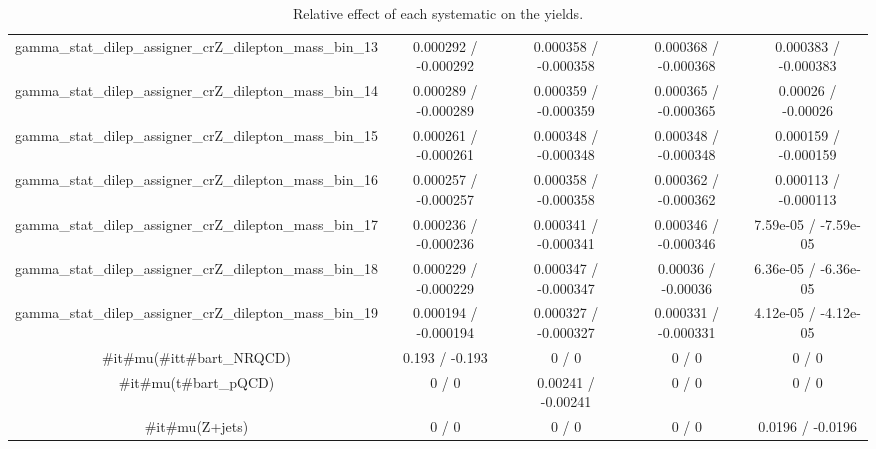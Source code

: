 \documentclass[10pt]{article}
\begin{document}
\begin{table}[htbp]
\begin{center}
\begin{tabular}{|c|c|c|c|c|}
  gamma_stat_dilep_assigner_crZ_dilepton_mass_bin_13 & 0.000292 / -0.000292 & 0.000358 / -0.000358 & 0.000368 / -0.000368 & 0.000383 / -0.000383 \\ 
  gamma_stat_dilep_assigner_crZ_dilepton_mass_bin_14 & 0.000289 / -0.000289 & 0.000359 / -0.000359 & 0.000365 / -0.000365 & 0.00026 / -0.00026 \\ 
  gamma_stat_dilep_assigner_crZ_dilepton_mass_bin_15 & 0.000261 / -0.000261 & 0.000348 / -0.000348 & 0.000348 / -0.000348 & 0.000159 / -0.000159 \\ 
  gamma_stat_dilep_assigner_crZ_dilepton_mass_bin_16 & 0.000257 / -0.000257 & 0.000358 / -0.000358 & 0.000362 / -0.000362 & 0.000113 / -0.000113 \\ 
  gamma_stat_dilep_assigner_crZ_dilepton_mass_bin_17 & 0.000236 / -0.000236 & 0.000341 / -0.000341 & 0.000346 / -0.000346 & 7.59e-05 / -7.59e-05 \\ 
  gamma_stat_dilep_assigner_crZ_dilepton_mass_bin_18 & 0.000229 / -0.000229 & 0.000347 / -0.000347 & 0.00036 / -0.00036 & 6.36e-05 / -6.36e-05 \\ 
  gamma_stat_dilep_assigner_crZ_dilepton_mass_bin_19 & 0.000194 / -0.000194 & 0.000327 / -0.000327 & 0.000331 / -0.000331 & 4.12e-05 / -4.12e-05 \\ 
  #it{#mu}(#it{t#bar{t}}_{NRQCD}) & 0.193 / -0.193 & 0 / 0 & 0 / 0 & 0 / 0 \\ 
  #it{#mu}(t#bar{t}_{pQCD}) & 0 / 0 & 0.00241 / -0.00241 & 0 / 0 & 0 / 0 \\ 
  #it{#mu}(Z+jets) & 0 / 0 & 0 / 0 & 0 / 0 & 0.0196 / -0.0196 \\ 
\hline 
\end{tabular} 
\caption{Relative effect of each systematic on the yields.} 
\end{center} 
\end{table} 
\end{document}
